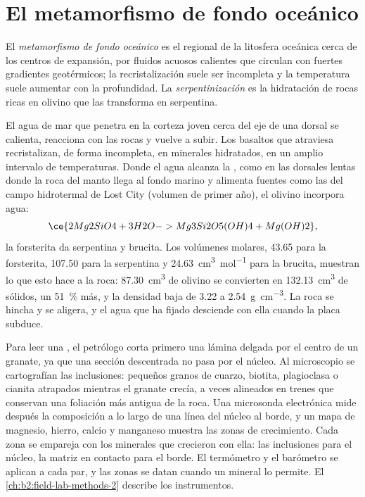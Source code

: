 \section{El metamorfismo de fondo oceánico}\label{sec:b2:pt-paths:ocean-floor}

\begin{definition}\label{def:b2:pt-paths:ocean-floor}
El \emph{metamorfismo de fondo oceánico} es el 
regional de la litosfera oceánica cerca de los centros de expansión, por fluidos acuosos calientes
que circulan con fuertes gradientes geotérmicos; la recristalización suele ser incompleta
y la temperatura suele aumentar con la profundidad. La \emph{serpentinización}
es la hidratación de rocas ricas en olivino que las transforma en serpentina.
\end{definition}

El agua de mar que penetra en la corteza joven cerca del eje de una dorsal se calienta, reacciona con las rocas y
vuelve a subir. Los basaltos que atraviesa recristalizan, de forma incompleta, en minerales
hidratados, en un amplio intervalo de temperaturas. Donde el agua alcanza la , como en
las dorsales lentas donde la roca del manto llega al fondo marino y alimenta fuentes como
las del campo hidrotermal de Lost City (volumen de primer año), el olivino incorpora agua:
\[
\ce{2 Mg2SiO4 + 3 H2O -> Mg3Si2O5(OH)4 + Mg(OH)2},
\]
la forsterita da serpentina y brucita. Los volúmenes molares, 43.65 para la forsterita, 107.50
para la serpentina y \qty{24.63}{cm^3.mol^{-1}} para la brucita, muestran lo que esto hace a la roca:
\qty{87.30}{cm^3} de olivino se convierten en \qty{132.13}{cm^3} de sólidos, un \qty{51}{\percent}
más, y la densidad baja de 3.22 a \qty{2.54}{g.cm^{-3}}. La roca se hincha y
se aligera, y el agua que ha fijado desciende con ella cuando la placa subduce.

\begin{inthelab}
Para leer una , el petrólogo corta primero una lámina delgada por el centro de un
granate, ya que una sección descentrada no pasa por el núcleo. Al microscopio se cartografían las inclusiones:
pequeños granos de cuarzo, biotita, plagioclasa o cianita atrapados mientras el granate
crecía, a veces alineados en trenes que conservan una foliación más antigua de la roca. Una microsonda
electrónica mide después la composición a lo largo de una línea del núcleo al borde, y un mapa de
magnesio, hierro, calcio y manganeso muestra las zonas de crecimiento. Cada zona se empareja con
los minerales que crecieron con ella: las inclusiones para el núcleo, la matriz en contacto para el
borde. El termómetro y el barómetro se aplican a cada par, y las zonas se datan cuando un
mineral lo permite. El \cref{ch:b2:field-lab-methods-2} describe los instrumentos.
\end{inthelab}

